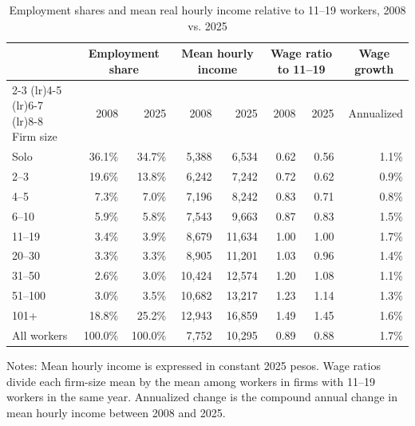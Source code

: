 \begin{table}[htbp]
  \centering
  \caption{Employment shares and mean real hourly income relative to 11--19 workers, 2008 vs. 2025}
  \label{tab:descriptive-core-size-2008-2025-11-19-reference}
  \small
  \begin{tabular}{lrrrrrrr}
    \toprule
    & \multicolumn{2}{c}{Employment share} & \multicolumn{2}{c}{Mean hourly income} & \multicolumn{2}{c}{Wage ratio to 11--19} & \multicolumn{1}{c}{Wage growth} \\
    \cmidrule(lr){2-3} \cmidrule(lr){4-5} \cmidrule(lr){6-7} \cmidrule(lr){8-8}
    Firm size & 2008 & 2025 & 2008 & 2025 & 2008 & 2025 & Annualized \\
    \midrule
    Solo & 36.1\% & 34.7\% &  5,388 &  6,534 & 0.62 & 0.56 & 1.1\% \\
    2--3 & 19.6\% & 13.8\% &  6,242 &  7,242 & 0.72 & 0.62 & 0.9\% \\
    4--5 & 7.3\% & 7.0\% &  7,196 &  8,242 & 0.83 & 0.71 & 0.8\% \\
    6--10 & 5.9\% & 5.8\% &  7,543 &  9,663 & 0.87 & 0.83 & 1.5\% \\
    11--19 & 3.4\% & 3.9\% &  8,679 & 11,634 & 1.00 & 1.00 & 1.7\% \\
    20--30 & 3.3\% & 3.3\% &  8,905 & 11,201 & 1.03 & 0.96 & 1.4\% \\
    31--50 & 2.6\% & 3.0\% & 10,424 & 12,574 & 1.20 & 1.08 & 1.1\% \\
    51--100 & 3.0\% & 3.5\% & 10,682 & 13,217 & 1.23 & 1.14 & 1.3\% \\
    101+ & 18.8\% & 25.2\% & 12,943 & 16,859 & 1.49 & 1.45 & 1.6\% \\
    \addlinespace
    All workers & 100.0\% & 100.0\% &  7,752 & 10,295 & 0.89 & 0.88 & 1.7\% \\
    \bottomrule
  \end{tabular}
  \vspace{0.3em}
  \begin{minipage}{0.95\textwidth}
  \footnotesize
  Notes: Mean hourly income is expressed in constant 2025 pesos. Wage ratios divide each firm-size mean by the mean among workers in firms with 11--19 workers in the same year. Annualized change is the compound annual change in mean hourly income between 2008 and 2025.
  \end{minipage}
\end{table}
